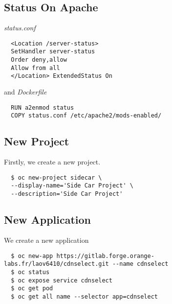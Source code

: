 \subsection{Status On Apache}

\emph{status.conf}
\begin{verbatim}
  <Location /server-status>
  SetHandler server-status
  Order deny,allow
  Allow from all
  </Location> ExtendedStatus On
\end{verbatim}

and  \emph{Dockerfile}
\begin{verbatim}
  RUN a2enmod status
  COPY status.conf /etc/apache2/mods-enabled/
\end{verbatim}

\subsection{New Project}

Firstly, we create a new project.

\begin{verbatim}
  $ oc new-project sidecar \
  --display-name='Side Car Project' \
  --description='Side Car Project'
\end{verbatim}

\subsection{New Application}

We create a new application

\begin{verbatim}
  $ oc new-app https://gitlab.forge.orange-labs.fr/laov6410/cdnselect.git --name cdnselect
  $ oc status
  $ oc expose service cdnselect
  $ oc get pod
  $ oc get all name --selector app=cdnselect
\end{verbatim}